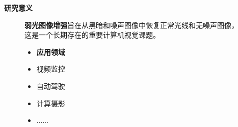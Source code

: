 \documentclass[CJK,aspectratio=169]{beamer}  %
\begin{document}
	\begin{frame}
		{ \yahei \textbf{研究意义}}
		\begin{figure}
			\centering			
			\begin{minipage}{.4\columnwidth}
				{ \yahei \textbf{弱光图像增强}旨在从黑暗和噪声图像中恢复正常光线和无噪声图像，这是一个长期存在的重要计算机视觉课题。}
				
				\vspace{0.5cm}
				
				\begin{itemize}
					\item {} \yahei \textbf{应用领域}
					
					\item[\checkmark]
					 \yahei 视频监控\textcolor{blue}{\citep{s20020495}}
					
					
					
					
					\item[\checkmark]
					 \yahei 自动驾驶\textcolor{blue}{\citep{li2021deep}}
					
					\item[\checkmark]
					 \yahei 计算摄影\textcolor{blue}{\citep{ma2022toward}}
					
					\item[\checkmark]
					 \yahei ......
					

\end{itemize}
\end{minipage}
\end{figure}
\end{frame}
\end{document}
